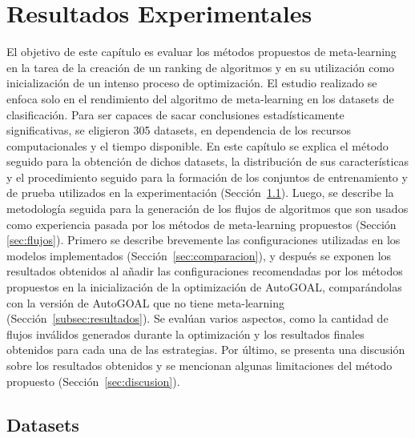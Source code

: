 \chapter{Resultados Experimentales}\label{chapter:results}

El objetivo de este capítulo es evaluar los métodos propuestos de meta-learning en la tarea de la creación de un ranking de algoritmos y en su utilización como inicialización de un intenso proceso de optimización. El estudio realizado se enfoca solo en el rendimiento del algoritmo de meta-learning en los datasets de clasificación. Para ser capaces de sacar conclusiones estadísticamente significativas, se eligieron 305 datasets, en dependencia de los recursos computacionales y el tiempo disponible. En este capítulo se explica el método seguido para la obtención de dichos datasets, la distribución de sus características y el procedimiento seguido para la formación de los conjuntos de entrenamiento y de prueba utilizados en la experimentación (Sección~\ref{sec:datasets}). Luego, se describe la metodología seguida para la generación de los flujos de algoritmos que son usados como experiencia pasada por los métodos de meta-learning propuestos (Sección \ref{sec:flujos}). Primero se describe brevemente las configuraciones utilizadas en los modelos implementados (Sección~\ref{sec:comparacion}), y después 
se exponen los resultados obtenidos al añadir las configuraciones recomendadas por los métodos propuestos en la inicialización de la optimización de AutoGOAL, comparándolas con la versión de AutoGOAL que no tiene meta-learning (Sección~\ref{subsec:resultados}). Se evalúan varios aspectos, como la cantidad de flujos inválidos generados durante la optimización y los resultados finales obtenidos para cada una de las estrategias. Por último, se presenta una discusión sobre los resultados obtenidos y se mencionan algunas limitaciones del método propuesto (Sección~\ref{sec:discusion}).


\section{Datasets}\label{sec:datasets}

%
%
%

